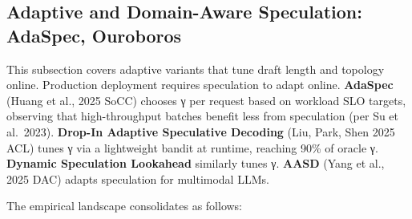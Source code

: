 \documentclass{article}
\begin{document}
\subsection{Adaptive and Domain-Aware Speculation: AdaSpec, Ouroboros}\label{adaptive-and-domain-aware-speculation-adaspec-ouroboros}

This subsection covers adaptive variants that tune draft length and topology online. Production deployment requires speculation to adapt online. \textbf{AdaSpec} (Huang et al., 2025 SoCC) chooses γ per request based on workload SLO targets, observing that high-throughput batches benefit less from speculation (per Su et al.~2023). \textbf{Drop-In Adaptive Speculative Decoding} (Liu, Park, Shen 2025 ACL) tunes γ via a lightweight bandit at runtime, reaching 90\% of oracle γ. \textbf{Dynamic Speculation Lookahead} \citep{mamou20242024} similarly tunes γ. \textbf{AASD} (Yang et al., 2025 DAC) adapts speculation for multimodal LLMs.

The empirical landscape consolidates as follows:
\end{document}
